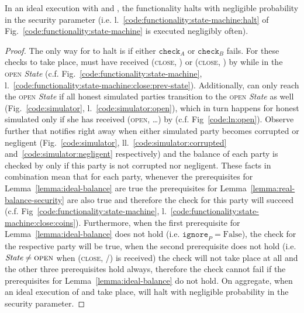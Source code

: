 \begin{lemma}[No halt]
\label{lemma:no-halt}
  In an ideal execution with \fchan and \simulator, the functionality halts with
  negligible probability in the security parameter (i.e.
  l.~\ref{code:functionality:state-machine:halt} of
  Fig.~\ref{code:functionality:state-machine} is executed negligibly often).
\end{lemma}

\begin{proof}
  The only way for \fchan to halt is if either $\texttt{check}_A$ or
  $\texttt{check}_B$ fails. For these checks to take place, \fchan must have
  received (\textsc{close}, \alice) or (\textsc{close}, \bob) by \simulator
  while in the \textsc{open} \textit{State} (c.f.
  Fig.~\ref{code:functionality:state-machine},
  l.~\ref{code:functionality:state-machine:close:prev-state}). Additionally,
  \fchan can only reach the \textsc{open} \textit{State} if all honest simulated
  parties transition to the \textsc{open} \textit{State} as well
  (Fig.~\ref{code:simulator}, l.~\ref{code:simulator:open}), which in turn
  happens for honest simulated \alice only if she has received (\textsc{open},
  \dots) by \environment (c.f. Fig~\ref{code:ln:open}). Observe further that
  \simulator notifies \fchan right away when either simulated party becomes
  corrupted or negligent (Fig.~\ref{code:simulator},
  ll.~\ref{code:simulator:corrupted} and~\ref{code:simulator:negligent}
  respectively) and the balance of each party is checked by \fchan only if this
  party is not corrupted nor negligent. These facts in combination mean that for
  each party, whenever the prerequisites for Lemma~\ref{lemma:ideal-balance} are
  true the prerequisites for Lemma~\ref{lemma:real-balance-security} are also
  true and therefore the check for this party will succeed (c.f.
  Fig~\ref{code:functionality:state-machine},
  l.~\ref{code:functionality:state-machine:close:coins}). Furthermore, when the
  first prerequisite for Lemma~\ref{lemma:ideal-balance} does not hold (i.e.
  $\texttt{ignore}_P = \mathrm{False}$), the check for the respective party will
  be true, when the second prerequisite does not hold (i.e.  $\textit{State}
  \neq \textsc{open}$ when (\textsc{close}, \alice/\bob) is received) the check
  will not take place at all and the other three prerequisites hold always,
  therefore the check cannot fail if the prerequisites for
  Lemma~\ref{lemma:ideal-balance} do not hold. On aggregate, when an ideal
  execution of \fchan and \simulator take place, \fchan will halt with
  negligible probability in the security parameter.
\end{proof}
